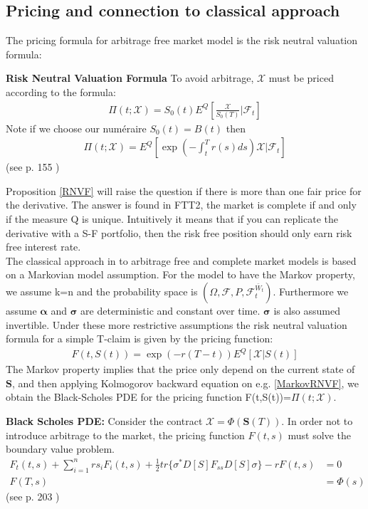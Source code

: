 \subsection{Pricing and connection to classical approach}
The pricing formula for arbitrage free market model is the risk neutral valuation formula:
\begin{proposition}{\textbf{Risk Neutral Valuation Formula}}\label{RNVF}
To avoid arbitrage, $\mathcal{X}$ must be priced according to the formula:
\begin{align}
\Pi(t;\mathcal{X})=S_0(t)E^Q[\frac{\mathcal{X}}{S_0(T)}|\mathcal{F}_t]
\end{align}
Note if we choose our numéraire $S_0(t)=B(t)$ then
\begin{align}
\Pi(t;\mathcal{X})=E^Q[\exp(-\int_t^T r(s) ds) \mathcal{X}|\mathcal{F}_t]
\end{align}
(see p. 155 \parencite{finKont})
\end{proposition}
Proposition \ref{RNVF} will raise the question if there is more than one fair price for the derivative. The answer is found in FTT2, the market is complete if and only if the measure Q is unique. Intuitively it means that if you can replicate the derivative with a S-F portfolio, then the risk free position should only earn risk free interest rate. \\

The classical approach in \parencite{B-S-Paper} to arbitrage free and complete market models is based on a Markovian model assumption. For the model to have the Markov property, we assume k=n and the probability space is $(\Omega, \mathcal{F}, P, \mathcal{F}_t^{\bar{W}_t})$. Furthermore we assume $\bm{\alpha}$ and $\bm{\sigma}$ are deterministic and constant over time. $\bm{\sigma}$ is also assumed invertible. Under these more restrictive assumptions the risk neutral valuation formula for a simple T-claim is given by the pricing function:
\begin{align}\label{MarkovRNVF}
F(t,S(t))=\exp(-r(T-t))E^Q[\mathcal{X}|S(t)]
\end{align}
The Markov property implies that the price only depend on the current state of $\bm{S}$, and then applying Kolmogorov backward equation on e.g. \ref{MarkovRNVF}, we obtain the Black-Scholes PDE for the pricing function F(t,S(t))=$\Pi(t; \mathcal{X})$.

\begin{theorem}\label{BSPDEMultiDim}
\textbf{Black Scholes PDE: } Consider the contract $\mathcal{X}=\Phi(\bm{S}(T))$. In order not to introduce arbitrage to the market, the pricing function $F(t,s)$ must solve the boundary value problem.
\begin{equation}
\begin{split}
F_t(t,s)+\sum_{i=1}^{n} rs_iF_i(t,s)+\frac{1}{2} tr\{\sigma^* D[S] F_{ss} D[S] \sigma\} -rF(t,s)&=0\\
F(T,s)&=\Phi(s)
\end{split}
\end{equation}
(see p. 203 \parencite{finKont})
\end{theorem}


